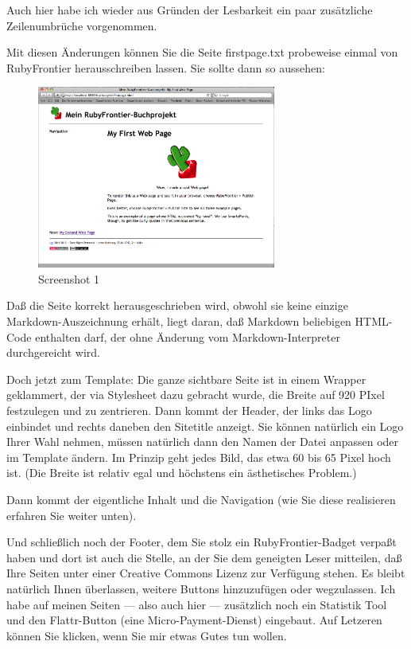 \documentclass[11pt]{report}
\begin{document}
Auch hier habe ich wieder aus Gründen der Lesbarkeit ein paar
zusätzliche Zeilenumbrüche vorgenommen.


Mit diesen Änderungen können Sie die Seite firstpage.txt probeweise
einmal von RubyFrontier herausschreiben lassen. Sie sollte dann so
aussehen:

\begin{figure}[h!]
\centering
\includegraphics[width=0.7\textwidth]{./images/buchprojekt01.png}
\caption{\label{buchprojekt01}Screenshot 1}
\end{figure}

Daß die Seite korrekt herausgeschrieben wird, obwohl sie keine einzige
Markdown-Auszeichnung erhält, liegt daran, daß Markdown beliebigen
HTML-Code enthalten darf, der ohne Änderung vom Markdown-Interpreter
durchgereicht wird.


Doch jetzt zum Template: Die ganze sichtbare Seite ist in einem
Wrapper geklammert, der via Stylesheet dazu gebracht wurde, die Breite
auf 920 PIxel festzulegen und zu zentrieren. Dann kommt der Header,
der links das Logo einbindet und rechts daneben den Sitetitle
anzeigt. Sie können natürlich ein Logo Ihrer Wahl nehmen, müssen
natürlich dann den Namen der Datei anpassen oder im Template
ändern. Im Prinzip geht jedes Bild, das etwa 60 bis 65 Pixel hoch
ist. (Die Breite ist relativ egal und höchstens ein ästhetisches
Problem.)


Dann kommt der eigentliche Inhalt und die Navigation (wie Sie diese
realisieren erfahren Sie weiter unten).


Und schließlich noch der Footer, dem Sie stolz ein RubyFrontier-Badget
verpaßt haben und dort ist auch die Stelle, an der Sie dem geneigten
Leser mitteilen, daß Ihre Seiten unter einer Creative Commons Lizenz
zur Verfügung stehen. Es bleibt natürlich Ihnen überlassen, weitere
Buttons hinzuzufügen oder wegzulassen. Ich habe auf meinen Seiten —
also auch hier — zusätzlich noch ein Statistik Tool und den
Flattr-Button (eine Micro-Payment-Dienst) eingebaut. Auf Letzeren
können Sie klicken, wenn Sie mir etwas Gutes tun wollen.
\end{document}
